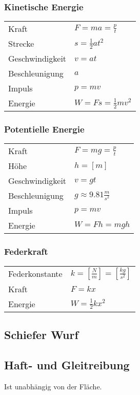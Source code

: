 \documentclass[a4paper]{scrartcl}
\begin{document}
\subsubsection{Kinetische Energie}
	\begin{tabu} {l X}
		Kraft & $F = ma = \frac{p}{t}$ \\
		Strecke & $s = \frac{1}{2} a t^2$ \\
		Geschwindigkeit & $v = at$ \\
		Beschleunigung & $a$\\
		Impuls & $p = mv$ \\
		Energie & $W = Fs = \frac{1}{2} mv^2$
	\end{tabu}

\subsubsection{Potentielle Energie}

\begin{tabu} {l X}
	Kraft & $F = mg = \frac{p}{t}$ \\
	Höhe & $h = \left[ m \right]$ \\
	Geschwindigkeit & $v = gt$ \\
	Beschleunigung & $g \approx 9.81 \frac{m}{s^2}$ \\
	Impuls & $p = mv$ \\
	Energie & $W = Fh = mgh$
\end{tabu}

\subsubsection{Federkraft}

	
	\begin{tabu} {l X}
		Federkonstante & $k = \left[ \frac{N}{m} \right] = \left[ \frac{kg}{s^2} \right]$ \\
		Kraft & $F = kx$ \\ %
		Energie & $	W = \frac{1}{2} k x^2$
	\end{tabu}
	

\subsection{Schiefer Wurf}

\subsection{Haft- und Gleitreibung}
	Ist unabhängig von der Fläche.
	
\end{document}
